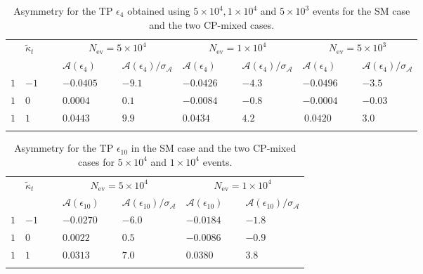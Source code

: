 \documentclass[aps,preprint,tightenlines,floatfix,superscriptaddress,nofootinbib,showpacs]{revtex4-1}
\begin{document}
\begin{table}[th]
\caption{Asymmetry for the TP $\epsilon_4$ obtained using $5\times
  10^4, 1 \times 10^4$ and $5\times 10^3$ events for the SM
  case and the two $\mathrm{CP}$-mixed cases. }
\label{table11}
\begin{center}
\begin{tabular}{|C{1cm}|C{1cm}||C{2cm}|C{2cm}||C{2cm}|C{2cm}||C{2cm}|C{2cm}|}
\hhline{|========|}
 &  &  &  &  \\ 
& & $\mathcal{A}(\epsilon_4)$~~&$\mathcal{A}(\epsilon_4)/\sigma_{\mathcal{A}}$ &  $\mathcal{A}(\epsilon_4)$~~&$\mathcal{A}(\epsilon_4)/\sigma_{\mathcal{A}}$ &  $\mathcal{A}(\epsilon_4)$~~&$\mathcal{A}(\epsilon_4)/\sigma_{\mathcal{A}}$ \\
\hhline{|========|} 
$1$ & $-1$~~~ & $-0.0405$~~~ & $-9.1$~~~ & $-0.0426$~~~ & $-4.3$~~~ & $-0.0496$~~~ & $-3.5$~~~ \\[0.6mm]
\hline
$1$ & $0$ & $0.0004$~ & $0.1$~ & $-0.0084$~~~ & $-0.8$~~~ & $-0.0004$~~~ & $-0.03$~~~ \\[0.6mm]
\hline
$1$ & $1$ & $0.0443$~ & $9.9$~ & $0.0434$~ & $4.2$~ & $\,0.0420$~ & $3.0\,\,$ \\
\hhline{|========|}
\end{tabular}
\end{center} 
\end{table}

\begin{table}[th]
\caption{Asymmetry for the TP $\epsilon_{10}$ in the SM case and the
  two $\mathrm{CP}$-mixed cases for
  $5\times 10^4$ and $1\times 10^4$ events.}
\label{table12}
\begin{center}
\begin{tabular}{|C{1cm}|C{1cm}||C{2cm}|C{2cm}||C{2cm}|C{2cm}|}
\hhline{|======|}
 &  &  &  \\ 
& & $\mathcal{A}(\epsilon_{10})$~~&$\mathcal{A}(\epsilon_{10})/\sigma_{\mathcal{A}}$ &  $\mathcal{A}(\epsilon_{10})$~~&$\mathcal{A}(\epsilon_{10})/\sigma_{\mathcal{A}}$ \\
\hhline{|======|} 
$1$ & $-1$~~~ & $-0.0270$~~~ & $-6.0$~~~ & $-0.0184$~~~ & $-1.8$~~~  \\[0.6mm]
\hline
$1$ & $0$ & $0.0022$~ & $0.5$~ & $-0.0086$~~~ & $-0.9$~~~  \\[0.6mm]
\hline
$1$ & $1$ & $0.0313$~ & $7.0$~ & $0.0380$~ & $3.8\,$ \\
\hhline{|======|}
\end{tabular}
\end{center} 
\end{table}
%
\end{document}

